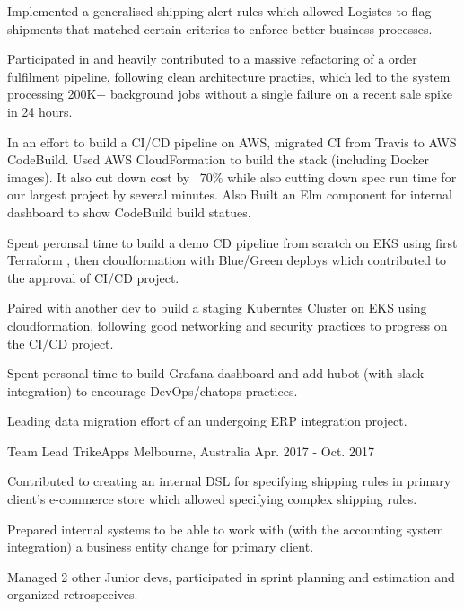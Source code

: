 \begin{cventries}
{\begin{cvitems}
        \item {Implemented a generalised shipping alert rules which allowed Logistcs to flag shipments that matched certain criteries to enforce better business processes.}
        \item {Participated in and heavily contributed to a massive refactoring of a order fulfilment pipeline, following clean architecture practies, which led to the system processing 200K+ background jobs without a single failure on a recent sale spike in 24 hours.}
        \item {In an effort to build a CI/CD pipeline on AWS, migrated CI from Travis to AWS CodeBuild. Used AWS CloudFormation to build the stack (including Docker images). It also cut down cost by ~70\% while also cutting down spec run time for our largest project by several minutes. Also Built an Elm component for internal dashboard to show CodeBuild build statues.}
        \item {Spent peronsal time to build a demo CD pipeline from scratch on EKS using first Terraform , then cloudformation with Blue/Green deploys which contributed to the approval of CI/CD project.}
        \item {Paired with another dev to build a staging Kuberntes Cluster on EKS using cloudformation, following good networking and security practices to progress on the CI/CD project.}
        \item {Spent personal time to build Grafana dashboard and add hubot (with slack integration) to encourage DevOps/chatops practices.}
        \item {Leading data migration effort of an undergoing ERP integration project.}
      \end{cvitems}
    }
  \cventry
    {Team Lead} %
    {TrikeApps} %
    {Melbourne, Australia} %
    {Apr. 2017 - Oct. 2017} %
    {
      \begin{cvitems} %
        \item {Contributed to creating an internal DSL for specifying shipping rules in primary client's e-commerce store which allowed specifying complex shipping rules.}
        \item {Prepared internal systems to be able to work with (with the accounting system integration) a business entity change for primary client.}
        \item {Managed 2 other Junior devs, participated in sprint planning and estimation and organized retrospecives.}

\end{cvitems}}
\end{cventries}
